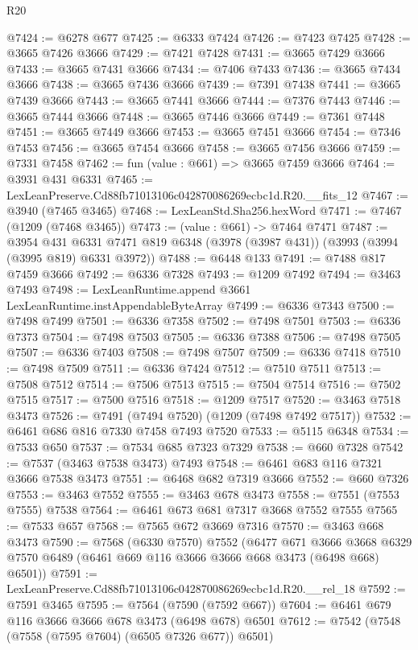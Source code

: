 \begin{lexlean}{R20}
\begin{coremodule}
@7424 := @6278 @677
@7425 := @6333 @7424
@7426 := @7423 @7425
@7428 := @3665 @7426 @3666
@7429 := @7421 @7428
@7431 := @3665 @7429 @3666
@7433 := @3665 @7431 @3666
@7434 := @7406 @7433
@7436 := @3665 @7434 @3666
@7438 := @3665 @7436 @3666
@7439 := @7391 @7438
@7441 := @3665 @7439 @3666
@7443 := @3665 @7441 @3666
@7444 := @7376 @7443
@7446 := @3665 @7444 @3666
@7448 := @3665 @7446 @3666
@7449 := @7361 @7448
@7451 := @3665 @7449 @3666
@7453 := @3665 @7451 @3666
@7454 := @7346 @7453
@7456 := @3665 @7454 @3666
@7458 := @3665 @7456 @3666
@7459 := @7331 @7458
@7462 := fun (value : @661) => @3665 @7459 @3666
@7464 := @3931 @431 @6331
@7465 := LexLeanPreserve.Cd88fb71013106c042870086269ecbc1d.R20.__fits_12
@7467 := @3940 (@7465 @3465)
@7468 := LexLeanStd.Sha256.hexWord
@7471 := @7467 (@1209 (@7468 @3465))
@7473 := (value : @661) -> @7464 @7471
@7487 := @3954
    @431
    @6331
    @7471
    @819
    @6348
    (@3978 (@3987 @431))
    (@3993 (@3994 (@3995 @819) @6331 @3972))
@7488 := @6448 @133
@7491 := @7488 @817 @7459 @3666
@7492 := @6336 @7328
@7493 := @1209 @7492
@7494 := @3463 @7493
@7498 := LexLeanRuntime.append @3661 LexLeanRuntime.instAppendableByteArray
@7499 := @6336 @7343
@7500 := @7498 @7499
@7501 := @6336 @7358
@7502 := @7498 @7501
@7503 := @6336 @7373
@7504 := @7498 @7503
@7505 := @6336 @7388
@7506 := @7498 @7505
@7507 := @6336 @7403
@7508 := @7498 @7507
@7509 := @6336 @7418
@7510 := @7498 @7509
@7511 := @6336 @7424
@7512 := @7510 @7511
@7513 := @7508 @7512
@7514 := @7506 @7513
@7515 := @7504 @7514
@7516 := @7502 @7515
@7517 := @7500 @7516
@7518 := @1209 @7517
@7520 := @3463 @7518 @3473
@7526 := @7491 (@7494 @7520) (@1209 (@7498 @7492 @7517))
@7532 := @6461 @686 @816 @7330 @7458 @7493 @7520
@7533 := @5115 @6348
@7534 := @7533 @650
@7537 := @7534 @685 @7323 @7329
@7538 := @660 @7328
@7542 := @7537 (@3463 @7538 @3473) @7493
@7548 := @6461 @683 @116 @7321 @3666 @7538 @3473
@7551 := @6468 @682 @7319 @3666
@7552 := @660 @7326
@7553 := @3463 @7552
@7555 := @3463 @678 @3473
@7558 := @7551 (@7553 @7555) @7538
@7564 := @6461 @673 @681 @7317 @3668 @7552 @7555
@7565 := @7533 @657
@7568 := @7565 @672 @3669 @7316
@7570 := @3463 @668 @3473
@7590 := @7568
    (@6330 @7570)
    @7552
    (@6477
      @671
      @3666
      @3668
      @6329
      @7570
      @6489
      (@6461 @669 @116 @3666 @3666 @668 @3473 (@6498 @668) @6501))
@7591 := LexLeanPreserve.Cd88fb71013106c042870086269ecbc1d.R20.__rel_18
@7592 := @7591 @3465
@7595 := @7564 (@7590 (@7592 @667))
@7604 := @6461 @679 @116 @3666 @3666 @678 @3473 (@6498 @678) @6501
@7612 := @7542 (@7548 (@7558 (@7595 @7604) (@6505 @7326 @677)) @6501)

\end{coremodule}
\end{lexlean}
